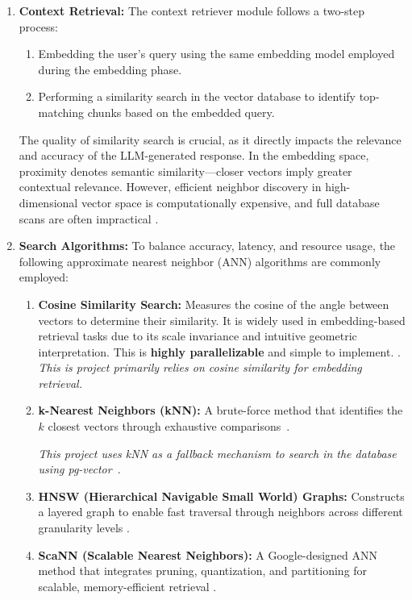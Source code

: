 \begin{enumerate}[label=\alph*.]
  \item \textbf{Context Retrieval:} The context retriever module follows a two-step process:
  \begin{enumerate}
    \item Embedding the user's query using the same embedding model employed during the embedding phase.
    \item Performing a similarity search in the vector database to identify top-matching chunks based on the embedded query.
  \end{enumerate}

  The quality of similarity search is crucial, as it directly impacts the relevance and accuracy of the LLM-generated response. In the embedding space, proximity denotes semantic similarity—closer vectors imply greater contextual relevance. However, efficient neighbor discovery in high-dimensional vector space is computationally expensive, and full database scans are often impractical \cite{sugawara2016approximately}.

  \item \textbf{Search Algorithms:} To balance accuracy, latency, and resource usage, the following approximate nearest neighbor (ANN) algorithms are commonly employed:
  \begin{enumerate}
    \item \textbf{Cosine Similarity Search:} Measures the cosine of the angle between vectors to determine their similarity. It is widely used in embedding-based retrieval tasks due to its scale invariance and intuitive geometric interpretation. 
    This is \textbf{highly parallelizable} and simple to implement. \cite{steck2024cosine}. 
    \textit{This is project primarily relies on cosine similarity for embedding retrieval.}
    
    \item \textbf{k-Nearest Neighbors (kNN):} A brute-force method that identifies the $k$ closest vectors through exhaustive comparisons~\cite{labelbox2023vectorsimilarity}.
    
    \textit{This project uses kNN as a fallback mechanism to search in the database using pg-vector}~\cite{pgvector}.

    \item \textbf{HNSW (Hierarchical Navigable Small World) Graphs:} Constructs a layered graph to enable fast traversal through neighbors across different granularity levels \cite{labelbox2023vectorsimilarity}.
    \item \textbf{ScaNN (Scalable Nearest Neighbors):} A Google-designed ANN method that integrates pruning, quantization, and partitioning for scalable, memory-efficient retrieval \cite{guo2020accelerating}.
  \end{enumerate}


\end{enumerate}
